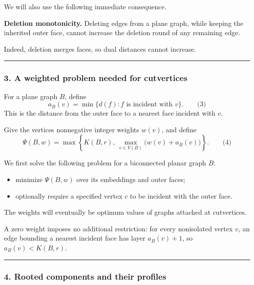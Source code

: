 \documentclass[
  11pt,
  a4paper,
]{article}
\providecommand{\tightlist}{%
  \setlength{\itemsep}{0pt}\setlength{\parskip}{0pt}}
\begin{document}
We will also use the following immediate consequence.

\textbf{Deletion monotonicity.} Deleting edges from a plane graph, while
keeping the inherited outer face, cannot increase the deletion round of
any remaining edge.

Indeed, deletion merges faces, so dual distances cannot increase.

\begin{center}\rule{0.5\linewidth}{0.5pt}\end{center}

\subsubsection{3. A weighted problem needed for
cutvertices}\label{a-weighted-problem-needed-for-cutvertices}

For a plane graph \(B\), define \[
a_B(v)=\min\{d(f):f\text{ is incident with }v\}.
\qquad\text{(3)}
\] This is the distance from the outer face to a nearest face incident
with \(v\).

Give the vertices nonnegative integer weights \(w(v)\), and define \[
\Psi(B,w)
=
\max\left\{
K(B,r),\
\max_{v\in V(B)}\bigl(w(v)+a_B(v)\bigr)
\right\}.
\qquad\text{(4)}
\]

We first solve the following problem for a biconnected planar graph
\(B\):

\begin{itemize}
\tightlist
\item
  minimize \(\Psi(B,w)\) over its embeddings and outer faces;
\item
  optionally require a specified vertex \(c\) to be incident with the
  outer face.
\end{itemize}

The weights will eventually be optimum values of graphs attached at
cutvertices.

A zero weight imposes no additional restriction: for every nonisolated
vertex \(v\), an edge bounding a nearest incident face has layer
\(a_B(v)+1\), so \(a_B(v)<K(B,r)\).

\begin{center}\rule{0.5\linewidth}{0.5pt}\end{center}

\subsubsection{4. Rooted components and their
profiles}\label{rooted-components-and-their-profiles}
\end{document}
